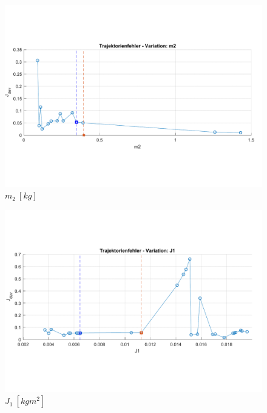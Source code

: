\begin{figure}[htbp]
	\centering
		\includegraphics[width=1.00\textwidth]{Bilder/Trajektorien/m2.pdf}
	\caption{$m_2 \ [kg]$}
	\label{fig:m2}
\end{figure}

\begin{figure}[htbp]
	\centering
		\includegraphics[width=1.00\textwidth]{Bilder/Trajektorien/J1.pdf}
	\caption{$J_1 \ [kgm^2]$}
	\label{fig:J1}
\end{figure}

